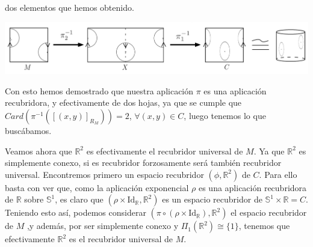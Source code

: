 \documentclass[fleqn]{article}
\def\R{\mathds{R}}
\def\S{\mathds{S}}
\begin{document}
\begin{enumerate}
                            dos elementos que hemos obtenido.
                            \begin{center}
                                \noindent
                                \includegraphics[width=1\linewidth]{caso2.png}
                            \end{center}
    \end{enumerate}

    Con esto hemos demostrado que nuestra aplicación $\pi$ es una aplicación recubridora, y efectivamente de dos hojas, ya que se cumple que 
    $Card(\pi^{-1}\left( \left[ \left( x,y \right) \right]_{R_M} \right)) = 2$, $\forall (x,y) \in C$, luego tenemos lo que buscábamos.


    Veamos ahora que $\R^2$ es efectivamente el recubridor universal de $M$. Ya que $\R^2$ es simplemente conexo, si es recubridor forzosamente será también 
    recubridor universal. Encontremos primero un espacio recubridor $(\phi, \R^2)$ de $C$. Para ello basta con ver que, como la aplicación exponencial $\rho$ 
    es una aplicación recubridora de $\R$ sobre $\S^1$, es claro que $(\rho \times \text{Id}_{\R}, \R^2)$ es un espacio recubridor de $\S^1 \times \R = C$. 
    Teniendo esto así, podemos considerar $(\pi \circ (\rho \times \text{Id}_{\R}), \R^2)$ el espacio recubridor de $M$ ,y además, por ser simplemente conexo y 
    $\Pi_1 (\R^2) \cong \{1\}$, tenemos que efectivamente $\R^2$ es el recubridor universal de $M$.
\end{document}
